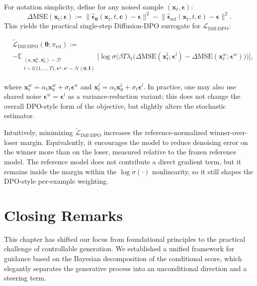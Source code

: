 For notation simplicity, define for any noised sample $(\mathbf x_t,\boldsymbol\epsilon)$:
\[
\Delta\mathrm{MSE}(\mathbf x_t;\boldsymbol\epsilon)
:= \big\|\hat{\boldsymbol\epsilon}_{\bm\theta}(\mathbf x_t,t,\mathbf c)-\boldsymbol\epsilon\big\|^2
 - \big\|\hat{\boldsymbol\epsilon}_{\mathrm{ref}}(\mathbf x_t,t,\mathbf c)-\boldsymbol\epsilon\big\|^2.
\]
This yields the practical single-step Diffusion-DPO surrogate
 for $\mathcal L_{\mathrm{Diff\text{-}DPO}}$:
\begin{mdframed}
\begin{align*}
    &\tilde{\mathcal L}_{\mathrm{Diff\text{-}DPO}}(\bm\theta;\pi_{\mathrm{ref}})
    :=
    \\&-\mathbb E_{\substack{(\mathbf c,\mathbf x_0^w,\mathbf x_0^l)\sim\mathcal D\\
    t\sim\mathcal U\{1,\dots,T\}, \boldsymbol\epsilon^w,\boldsymbol\epsilon^l\sim\mathcal N(\mathbf 0,\mathbf I)}}
    \Big[
    \log\sigma \Big(
    \beta T\lambda_t\big(\Delta\mathrm{MSE}(\mathbf x_t^l;\boldsymbol\epsilon^l)-\Delta\mathrm{MSE}(\mathbf x_t^w;\boldsymbol\epsilon^w)\big)
    \Big)
    \Big],
\end{align*}
\end{mdframed}
where
$\mathbf x_t^w=\alpha_t\mathbf x_0^w+\sigma_t\boldsymbol\epsilon^w$
and
$\mathbf x_t^l=\alpha_t\mathbf x_0^l+\sigma_t\boldsymbol\epsilon^l$.
In practice, one may also use shared noise
$\boldsymbol\epsilon^w=\boldsymbol\epsilon^l$
as a variance-reduction variant; this does not change the overall DPO-style form
of the objective, but slightly alters the stochastic estimator.

Intuitively, minimizing $\tilde{\mathcal L}_{\mathrm{Diff\text{-}DPO}}$ increases the reference-normalized winner-over-loser margin. Equivalently, it encourages the model to reduce denoising error on the winner more than on the loser, measured relative to the frozen reference model. The reference model does not contribute a direct gradient term, but it remains inside the margin within the $\log\sigma(\cdot)$ nonlinearity, so it still shapes the DPO-style per-example weighting.


\newpage
\section{Closing Remarks}\label{sec:ch8_cr}

This chapter has shifted our focus from foundational principles to the practical challenge of controllable generation. We established a unified framework for guidance based on the Bayesian decomposition of the conditional score, which elegantly separates the generative process into an unconditional direction and a steering term.

